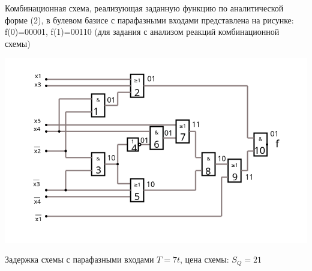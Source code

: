 Комбинационная схема, реализующая заданную функцию по аналитической 
форме (2), в булевом базисе с парафазными входами представлена  на  рисунке: \\
f(0)=00001, f(1)=00110 (для задания с анализом реакций комбинационной схемы)
\begin{center}
\includegraphics[width=\linewidth]{imgs/circuit-boolean_basis.png}
\end{center}
Задержка схемы с парафазными входами $T=7t$, цена схемы: $S_Q = 21$ 
